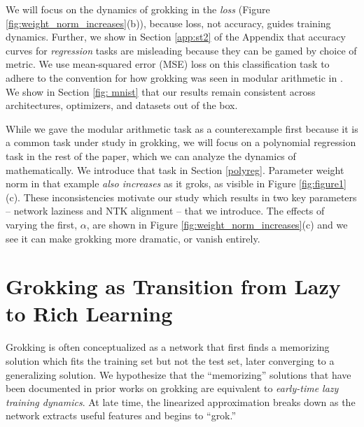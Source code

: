 \documentclass{article} %
\begin{document}
We will focus on the dynamics of grokking in the \textit{loss} (Figure \ref{fig:weight_norm_increases}(b)), because loss, not accuracy, guides training dynamics. Further, we show in Section \ref{app:st2} of the Appendix that accuracy curves for \textit{regression} tasks are misleading because they can be gamed by choice of metric. We use mean-squared error (MSE) loss on this classification task to adhere to the convention for how grokking was seen in modular arithmetic in \cite{liu2022omnigrok, gromov2023grokking}. We show in Section \ref{fig: mnist} that our results remain consistent across architectures, optimizers, and datasets out of the box. 

While we gave the modular arithmetic task as a counterexample first because it is a common task under study in grokking, we will focus on a polynomial regression task in the rest of the paper, which we can analyze the dynamics of mathematically. We introduce that task in Section \ref{polyreg}. Parameter weight norm in that example \textit{also increases} as it groks, as visible in Figure \ref{fig:figure1} (c). These inconsistencies motivate our study which results in two key parameters -- network laziness and NTK alignment -- that we introduce. The effects of varying the first, $\alpha$, are shown in Figure \ref{fig:weight_norm_increases}(c) and we see it can make grokking more dramatic, or vanish entirely. 


\section{Grokking as Transition from Lazy to Rich Learning}

Grokking is often conceptualized as a network that first finds a memorizing solution which fits the training set but not the test set, later converging to a generalizing solution. We hypothesize that the ``memorizing'' solutions that have been documented in prior works on grokking are equivalent to \textit{early-time lazy training dynamics}. At late time, the linearized approximation breaks down as the network extracts useful features and begins to ``grok.''
\end{document}
